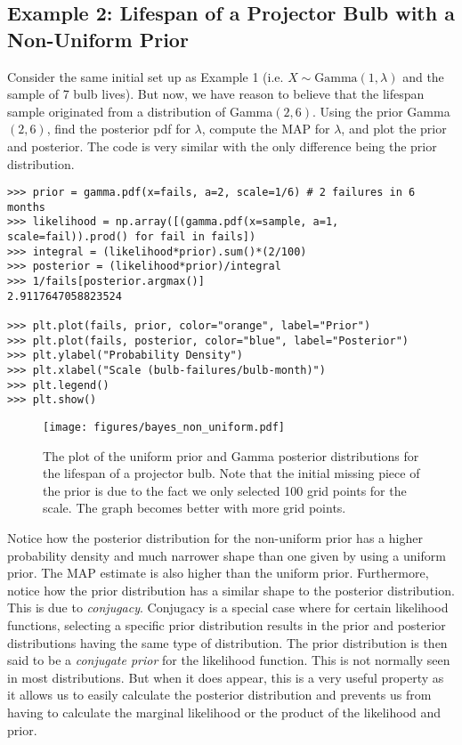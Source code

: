 \subsection*{Example 2: Lifespan of a Projector Bulb with a Non-Uniform Prior}
Consider the same initial set up as Example 1 (i.e. $X\sim\text{Gamma}(1,\lambda)$ and the sample of 7 bulb lives).
But now, we have reason to believe that the lifespan sample originated from a distribution of Gamma$(2,6)$.
Using the prior Gamma$(2,6)$, find the posterior pdf for $\lambda$, compute the MAP for $\lambda$, and plot the prior and posterior.
The code is very similar with the only difference being the prior distribution.

\begin{lstlisting}
>>> prior = gamma.pdf(x=fails, a=2, scale=1/6) # 2 failures in 6 months
>>> likelihood = np.array([(gamma.pdf(x=sample, a=1, scale=fail)).prod() for fail in fails])
>>> integral = (likelihood*prior).sum()*(2/100)
>>> posterior = (likelihood*prior)/integral
>>> 1/fails[posterior.argmax()]
2.9117647058823524

>>> plt.plot(fails, prior, color="orange", label="Prior")
>>> plt.plot(fails, posterior, color="blue", label="Posterior")
>>> plt.ylabel("Probability Density")
>>> plt.xlabel("Scale (bulb-failures/bulb-month)")
>>> plt.legend()
>>> plt.show()
\end{lstlisting}

\begin{figure}[H]
    \centering
    \texttt{[image: figures/bayes\_non\_uniform.pdf]}
    \caption{The plot of the uniform prior and Gamma posterior distributions for the lifespan of a projector bulb. Note that the initial missing piece of the prior is due to the fact we
    only selected 100 grid points for the scale. The graph becomes better with more grid points.}
\end{figure}

Notice how the posterior distribution for the non-uniform prior has a higher probability density and much narrower shape than one given by using a uniform prior.
The MAP estimate is also higher than the uniform prior.
Furthermore, notice how the prior distribution has a similar shape to the posterior distribution.
This is due to \emph{conjugacy}. Conjugacy is a special case where for certain likelihood functions, selecting a specific prior distribution results in the prior and posterior distributions having the same type of distribution.
The prior distribution is then said to be a \emph{conjugate prior} for the likelihood function.
This is not normally seen in most distributions.
But when it does appear, this is a very useful property as it allows us to easily calculate the posterior distribution and prevents us from having to calculate the marginal likelihood or the product of the likelihood and prior.

